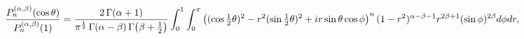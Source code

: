 \[\frac{\mathop{P^{(\alpha,\beta)}_{n}\/}\nolimits\!\left(\mathop{\cos\/}%
\nolimits\theta\right)}{\mathop{P^{(\alpha,\beta)}_{n}\/}\nolimits\!\left(1%
\right)}=\frac{2\mathop{\Gamma\/}\nolimits\!\left(\alpha+1\right)}{\pi^{\frac{%
1}{2}}\mathop{\Gamma\/}\nolimits\!\left(\alpha-\beta\right)\mathop{\Gamma\/}%
\nolimits\!\left(\beta+\tfrac{1}{2}\right)}\*\int_{0}^{1}\int_{0}^{\pi}\left((%
\mathop{\cos\/}\nolimits\tfrac{1}{2}\theta)^{2}-r^{2}(\mathop{\sin\/}\nolimits%
\tfrac{1}{2}\theta)^{2}+ir\mathop{\sin\/}\nolimits\theta\mathop{\cos\/}%
\nolimits\phi\right)^{n}(1-r^{2})^{\alpha-\beta-1}r^{2\beta+1}(\mathop{\sin\/}%
\nolimits\phi)^{2\beta}d\phi dr,\]